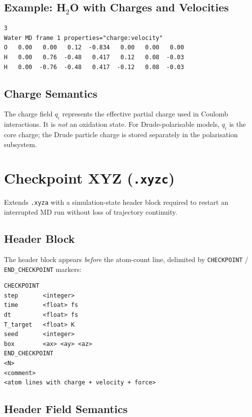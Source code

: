 \documentclass[12pt, a4paper, oneside]{article}
\begin{document}
\subsection{Example: H\texorpdfstring{$_2$}{2}O with Charges and Velocities}

\begin{lstlisting}[language={},frame=single]
3
Water MD frame 1 properties="charge:velocity"
O   0.00   0.00   0.12  -0.834   0.00   0.00   0.00
H   0.00   0.76  -0.48   0.417   0.12   0.08  -0.03
H   0.00  -0.76  -0.48   0.417  -0.12   0.08  -0.03
\end{lstlisting}

\subsection{Charge Semantics}

The charge field $q_i$ represents the effective partial charge used in
Coulomb interactions.  It is \emph{not} an oxidation state.  For
Drude-polarisable models, $q_i$ is the core charge; the Drude
particle charge is stored separately in the polarisation subsystem.

\section{Checkpoint XYZ (\texttt{.xyzc})}
\label{sec:xyzc}

Extends \texttt{.xyza} with a simulation-state header block required
to restart an interrupted MD run without loss of trajectory continuity.

\subsection{Header Block}

The header block appears \emph{before} the atom-count line, delimited
by \texttt{CHECKPOINT} / \texttt{END\_CHECKPOINT} markers:

\begin{lstlisting}[language={},frame=single]
CHECKPOINT
step       <integer>
time       <float> fs
dt         <float> fs
T_target   <float> K
seed       <integer>
box        <ax> <ay> <az>
END_CHECKPOINT
<N>
<comment>
<atom lines with charge + velocity + force>
\end{lstlisting}

\subsection{Header Field Semantics}
\end{document}
